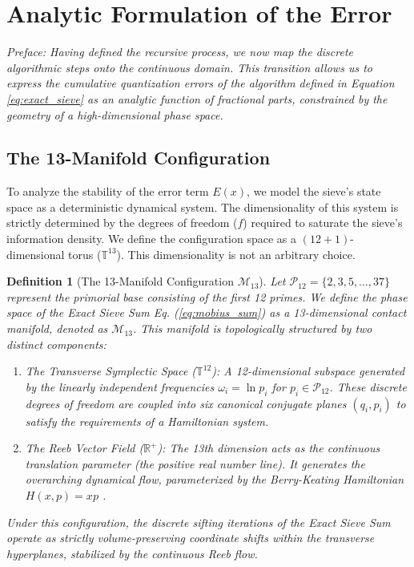 \documentclass[sn-mathphys-num, pdflatex, referee]{sn-jnl}
\newtheorem{definition}[theorem]{Definition}
\begin{document}
\section{Analytic Formulation of the Error}
\label{sec:analysis}

\textit{Preface: Having defined the recursive process, we now map the discrete algorithmic steps onto the continuous domain. This transition allows us to express the cumulative quantization errors of the algorithm defined in Equation \ref{eq:exact_sieve} as an analytic function of fractional parts, constrained by the geometry of a high-dimensional phase space.}

\subsection{The 13-Manifold Configuration}
\label{sec:13manifold}
To analyze the stability of the error term $E(x)$, we model the sieve's state space as a deterministic dynamical system. The dimensionality of this system is strictly determined by the degrees of freedom ($f$) required to saturate the sieve's information density. We define the configuration space as a $(12+1)$-dimensional torus ($\mathbb{T}^{13}$). This dimensionality is not an arbitrary choice.

\begin{definition}[The 13-Manifold Configuration $\mathcal{M}_{13}$] \label{def4.1}
Let $\mathcal{P}_{12} = \{2, 3, 5, \dots, 37\}$ represent the primorial base consisting of the first 12 primes\label{P}. We define the phase space of the Exact Sieve Sum Eq. (\ref{eq:mobius_sum}) as a 13-dimensional contact manifold, denoted as $\mathcal{M}_{13}$. This manifold is topologically structured by two distinct components:
\begin{enumerate}
    \item \textit{The Transverse Symplectic Space ($\mathbb{T}^{12}$):} A 12-dimensional subspace generated by the linearly independent frequencies $\omega_i = \ln p_i$ for $p_i \in \mathcal{P}_{12}$. These discrete degrees of freedom are coupled into six canonical conjugate planes $(q_i, p_i)$ to satisfy the requirements of a Hamiltonian system.
    \item \textit{The Reeb Vector Field \label{Reeb} ($\mathbb{R}^+$):} The 13th dimension acts as the continuous translation parameter (the positive real number line). It generates the overarching dynamical flow, parameterized by the Berry-Keating Hamiltonian $H(x,p) = xp$ \cite{berry1999riemann}.
\end{enumerate}
Under this configuration, the discrete sifting iterations of the Exact Sieve Sum operate as strictly volume-preserving coordinate shifts within the transverse hyperplanes, stabilized by the continuous Reeb flow.
\end{definition} 
\end{document}
